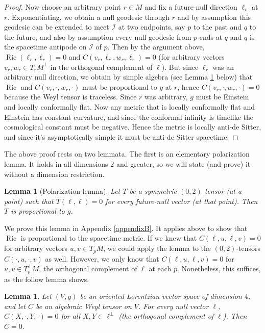 \documentclass[12pt]{amsart}
\numberwithin{equation}{section}
\newtheorem{lemma}[theorem]{Lemma}
\DeclareMathOperator{\ric}{Ric}
\begin{document}
\begin{proof}
Now choose an arbitrary point $r\in M$ and fix a future-null direction $\ell_r$ at $r$. Exponentiating, we obtain a null geodesic through $r$ and by assumption this geodesic can be extended to meet ${\mathcal I}$ at two endpoints, say $p$ to the past and $q$ to the future, and also by assumption every null geodesic from $p$ ends at $q$ and $q$ is the spacetime antipode on ${\mathcal I}$ of $p$. Then by the argument above, $\ric(\ell_r,\ell_r)=0$ and $C(v_r,\ell_r,w_r,\ell_r) =0$ (for arbitrary vectors $v_r, w_r\in T_rM^{\perp}$ in the orthogonal complement of $\ell$). But since $\ell_r$ was an arbitrary null direction, we obtain by simple algebra (see Lemma \ref{lemma3.2} below) that $\ric$ and $C(v_r,\cdot,w_r,\cdot)$ must be proportional to $g$ at $r$, hence $C(v_r,\cdot,w_r,\cdot)=0$ because the Weyl tensor is traceless. Since $r$ was arbitrary, $g$ must be Einstein and locally conformally flat. Now any metric that is locally conformally flat and Einstein has constant curvature, and since the conformal infinity is timelike the cosmological constant must be negative. Hence the metric is locally anti-de Sitter, and since it's asymptotically simple it must be anti-de Sitter spacetime.
\end{proof}

The above proof rests on two lemmata. The first is an elementary polarization lemma. It holds in all dimensions $2$ and greater, so we will state (and prove) it without a dimension restriction.

\begin{lemma}[Polarization lemma]\label{lemma3.2}
Let $T$ be a symmetric $(0,2)$-tensor (at a point) such that $T(\ell,\ell)=0$ for every future-null vector (at that point). Then $T$ is proportional to $g$.
\end{lemma}

We prove this lemma in Appendix \ref{appendixB}. It applies above to show that $\ric$ is proportional to the spacetime metric. If we knew that $C(\ell,u,\ell,v)=0$ for arbitrary vectors $u,v\in T_pM$, we could apply the lemma to the $(0,2)$-tensors $C(\cdot,u,\cdot,v)$ as well. However, we only know that $C(\ell,u,\ell,v)=0$ for $u,v\in T_p^{\perp}M$, the orthogonal complement of $\ell$ at each $p$. Nonetheless, this suffices, as the follow lemma shows.

\begin{lemma}\label{lemma3.3}
Let $(V, g)$ be an oriented Lorentzian vector space of dimension $4$, and
let $C$ be an algebraic Weyl tensor on $V$. For every null vector $\ell$,
$C(X,\cdot,Y,\cdot) = 0$ for all $X,Y \in \ell^{\perp}$ (the orthogonal complement of $\ell$).
Then $C = 0$.
\end{lemma}
\end{document}
